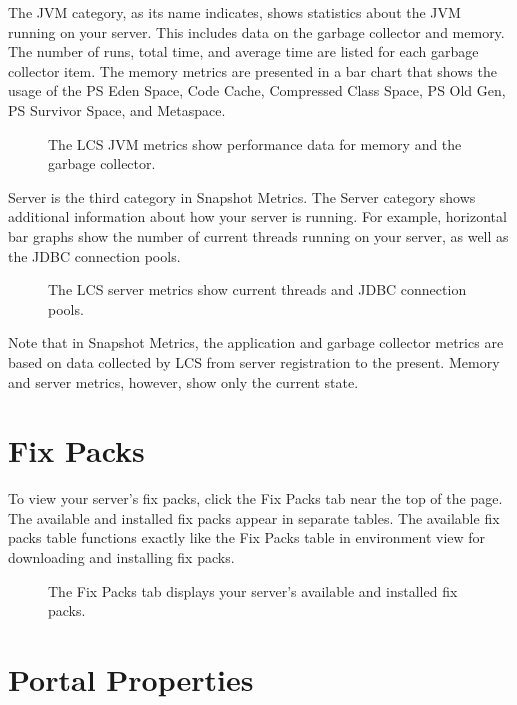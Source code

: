 The JVM category, as its name indicates, shows statistics about the JVM
running on your server. This includes data on the garbage collector and
memory. The number of runs, total time, and average time are listed for
each garbage collector item. The memory metrics are presented in a bar
chart that shows the usage of the PS Eden Space, Code Cache, Compressed
Class Space, PS Old Gen, PS Survivor Space, and Metaspace.

\begin{figure}
\centering
{}
\caption{The LCS JVM metrics show performance data for memory and the
garbage collector.}
\end{figure}

Server is the third category in Snapshot Metrics. The Server category
shows additional information about how your server is running. For
example, horizontal bar graphs show the number of current threads
running on your server, as well as the JDBC connection pools.

\begin{figure}
\centering
{}
\caption{The LCS server metrics show current threads and JDBC connection
pools.}
\end{figure}

Note that in Snapshot Metrics, the application and garbage collector
metrics are based on data collected by LCS from server registration to
the present. Memory and server metrics, however, show only the current
state.

\section{Fix Packs}\label{fix-packs-1}

To view your server's fix packs, click the Fix Packs tab near the top of
the page. The available and installed fix packs appear in separate
tables. The available fix packs table functions exactly like the Fix
Packs table in environment view for downloading and installing fix
packs.

\begin{figure}
\centering
{}
\caption{The Fix Packs tab displays your server's available and
installed fix packs.}
\end{figure}

\section{Portal Properties}\label{portal-properties}

